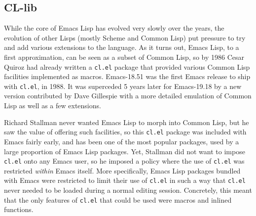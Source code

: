 \documentclass[format=acmsmall, review]{acmart}
\newcommand \Elisp {Emacs Lisp}
\begin{document}
\subsection{CL-lib}          %
\label{sec:cl-lib}

While the core of \Elisp{} has evolved very slowly over the years, the
evolution of other Lisps (mostly Scheme and Common Lisp) put pressure to
try and add various extensions to the language.  As it turns out, \Elisp{},
to a first approximation, can be seen as a subset of Common Lisp, so by
1986 Cesar Quiroz  had already written
a \texttt{cl.el} package that provided various
Common Lisp facilities implemented as macros.  Emacs-18.51 was the
first Emacs release to ship with \texttt{cl.el}, in 1988.  It was superceded
5 years later for Emacs-19.18 by a new version contributed by Dave
Gillespie with a more detailed emulation of Common Lisp as well as a few
extensions.

Richard Stallman never wanted \Elisp{} to morph into Common Lisp, but he saw
the value of offering such facilities, so this \texttt{cl.el} package was
included with Emacs fairly early, and has been one of the most popular
packages, used by a large proportion of \Elisp{} packages.  Yet,
Stallman did
not want to impose \texttt{cl.el} onto any Emacs user, so he imposed
a policy where the use of \texttt{cl.el} was restricted \emph{within} Emacs
itself.  More specifically, \Elisp{} packages bundled with Emacs were
restricted to limit their use of \texttt{cl.el} in such a way that
\texttt{cl.el} never needed to be loaded during a normal editing session.
Concretely, this meant that the only features of \texttt{cl.el} that could
be used were macros and inlined functions.
\end{document}

